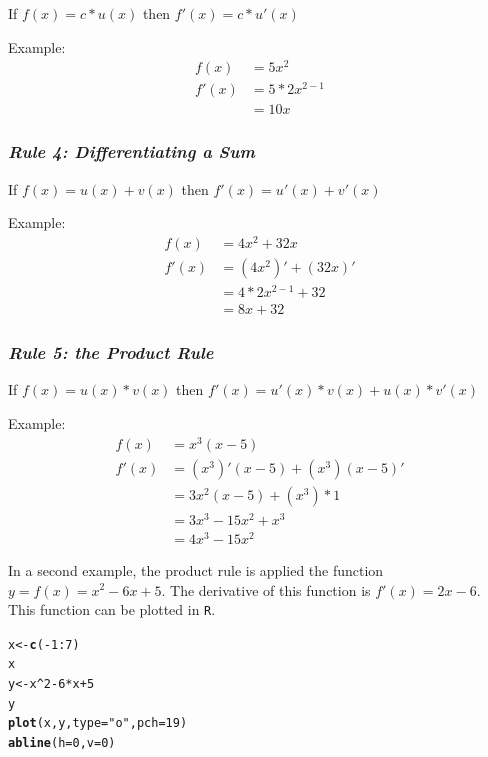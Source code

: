 \documentclass[11pt,openany]{book}\usepackage[]{graphicx}\usepackage[]{color}
\makeatletter
\newcommand{\hlnum}[1]{\textcolor[rgb]{0.686,0.059,0.569}{#1}}%
\newcommand{\hlstr}[1]{\textcolor[rgb]{0.192,0.494,0.8}{#1}}%
\newcommand{\hlopt}[1]{\textcolor[rgb]{0,0,0}{#1}}%
\newcommand{\hlstd}[1]{\textcolor[rgb]{0.345,0.345,0.345}{#1}}%
\newcommand{\hlkwb}[1]{\textcolor[rgb]{0.69,0.353,0.396}{#1}}%
\newcommand{\hlkwc}[1]{\textcolor[rgb]{0.333,0.667,0.333}{#1}}%
\newcommand{\hlkwd}[1]{\textcolor[rgb]{0.737,0.353,0.396}{\textbf{#1}}}%
\newenvironment{kframe}{%
 \def\at@end@of@kframe{}%
 \ifinner\ifhmode%
  \def\at@end@of@kframe{\end{minipage}}%
  \begin{minipage}{\columnwidth}%
 \fi\fi%
 \def\FrameCommand##1{\hskip\@totalleftmargin \hskip-\fboxsep
 \colorbox{shadecolor}{##1}\hskip-\fboxsep
     \hskip-\linewidth \hskip-\@totalleftmargin \hskip\columnwidth}%
 \MakeFramed {\advance\hsize-\width
   \@totalleftmargin\z@ \linewidth\hsize
   \@setminipage}}%
 {\par\unskip\endMakeFramed%
 \at@end@of@kframe}
\newenvironment{knitrout}{}{} %
\renewenvironment{knitrout}{\begin{singlespace}}{\end{singlespace}} %
\makeatother
\begin{document}
  \begin{center}
    If $f(x)=c*u(x)$ then $f'(x)=c*u'(x)$
  \end{center}
\noindent Example:
\begin{align*}
f(x) &= 5x^{2} \\ 
f'(x)&=5*2x^{2-1} \\
&=10x
\end{align*}

\subsubsection{\textit{Rule 4: Differentiating a Sum}}

  \begin{center}
    If $f(x)=u(x)+v(x)$ then $f'(x)=u'(x)+v'(x)$
  \end{center}
\noindent Example:  
\begin{align*}
f(x)&= 4x^{2}+32x \\
f'(x)&=(4x^{2})'+(32x)' \\
&=4*2x^{2-1}+32 \\
&=8x+32 
\end{align*}

\subsubsection{\textit{Rule 5: the Product Rule}}

  \begin{center}
    If $f(x)=u(x)*v(x)$ then $f'(x)=u'(x)*v(x)+u(x)*v'(x)$
  \end{center}
\noindent Example: 
\begin{align*}
f(x) &= x^{3}(x-5) \\ 
f'(x)&=(x^{3})'(x-5)+(x^{3})(x-5)' \\
&=3x^{2}(x-5)+(x^{3})*1 \\
&=3x^{3}-15x^{2}+x^{3}\\
&=4x^{3}-15x^{2} 
\end{align*}

In a second example, the product rule is applied the function $y=f(x)=x^{2}-6x+5$. The derivative of this function is $f'(x)=2x-6$. This function can be plotted in \texttt{R}.  

\begin{knitrout}
\color{fgcolor}\begin{kframe}
\begin{alltt}
\hlstd{x} \hlkwb{<-} \hlkwd{c}\hlstd{(}\hlopt{-}\hlnum{1}\hlopt{:}\hlnum{7}\hlstd{)}
\hlstd{x}
\hlstd{y} \hlkwb{<-} \hlstd{x}\hlopt{^}\hlnum{2} \hlopt{-} \hlnum{6} \hlopt{*} \hlstd{x} \hlopt{+} \hlnum{5}
\hlstd{y}
\hlkwd{plot}\hlstd{(x, y,} \hlkwc{type} \hlstd{=} \hlstr{"o"}\hlstd{,} \hlkwc{pch} \hlstd{=} \hlnum{19}\hlstd{)}
\hlkwd{abline}\hlstd{(}\hlkwc{h} \hlstd{=} \hlnum{0}\hlstd{,} \hlkwc{v} \hlstd{=} \hlnum{0}\hlstd{)}
\end{alltt}
\end{kframe}
\end{knitrout}
\end{document}
